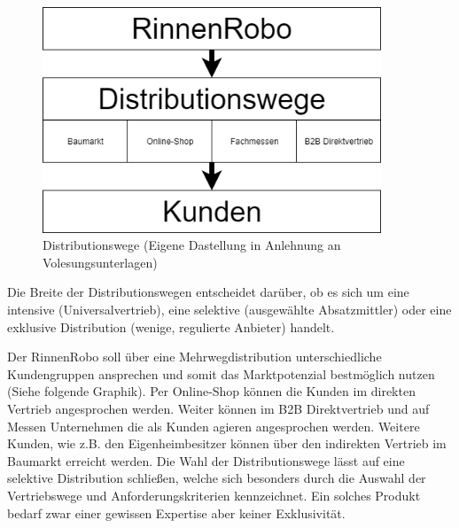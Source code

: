         \begin{figure}[ht]
            \centering
            \includegraphics[width = 0.9\textwidth]{Eigene Darstellungen/Distributionswege1.png}
    
            \caption{Distributionswege (Eigene Dastellung in Anlehnung an Volesungsunterlagen)}
         \end{figure}
         \pagebreak
    
        \noindent
        Die Breite der Distributionswegen entscheidet darüber, ob es sich um eine intensive (Universalvertrieb), eine
        selektive (ausgewählte Absatzmittler) oder eine exklusive Distribution (wenige, regulierte Anbieter) handelt.
    
        \noindent
        Der RinnenRobo soll über eine Mehrwegdistribution unterschiedliche Kundengruppen ansprechen und somit das
        Marktpotenzial bestmöglich nutzen (Siehe folgende Graphik). Per Online-Shop können die Kunden im direkten Vertrieb
        angesprochen werden. Weiter können im B2B Direktvertrieb und auf Messen Unternehmen die als Kunden agieren
        angesprochen werden. Weitere Kunden, wie z.B. den Eigenheimbesitzer können über den indirekten Vertrieb im Baumarkt
        erreicht werden. Die Wahl der Distributionswege lässt auf eine selektive Distribution schließen, welche sich
        besonders durch die Auswahl der Vertriebswege und Anforderungskriterien kennzeichnet. Ein solches Produkt bedarf
        zwar einer gewissen Expertise aber keiner Exklusivität.
